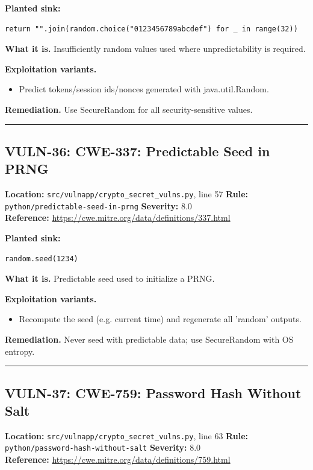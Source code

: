 \documentclass[11pt,a4paper]{article}
\begin{document}
\noindent\textbf{Planted sink:}
\begin{lstlisting}
return "".join(random.choice("0123456789abcdef") for _ in range(32))
\end{lstlisting}
\noindent\textbf{What it is.} Insufficiently random values used where unpredictability is required.

\noindent\textbf{Exploitation variants.}
\begin{itemize}[leftmargin=1.4em,itemsep=1pt,topsep=2pt]
\item Predict tokens/session ids/nonces generated with java.util.Random.
\end{itemize}
\noindent\textbf{Remediation.} Use SecureRandom for all security-sensitive values.

\vspace{4pt}\hrule\vspace{6pt}
\subsection{VULN-36: CWE-337: Predictable Seed in PRNG}
\noindent\textbf{Location:} \texttt{src/vulnapp/crypto\_secret\_vulns.py}, line 57 \quad \textbf{Rule:} \texttt{python/predictable-seed-in-prng} \quad \textbf{Severity:} 8.0
\\ \textbf{Reference:} \url{https://cwe.mitre.org/data/definitions/337.html}

\noindent\textbf{Planted sink:}
\begin{lstlisting}
random.seed(1234)
\end{lstlisting}
\noindent\textbf{What it is.} Predictable seed used to initialize a PRNG.

\noindent\textbf{Exploitation variants.}
\begin{itemize}[leftmargin=1.4em,itemsep=1pt,topsep=2pt]
\item Recompute the seed (e.g. current time) and regenerate all 'random' outputs.
\end{itemize}
\noindent\textbf{Remediation.} Never seed with predictable data; use SecureRandom with OS entropy.

\vspace{4pt}\hrule\vspace{6pt}
\subsection{VULN-37: CWE-759: Password Hash Without Salt}
\noindent\textbf{Location:} \texttt{src/vulnapp/crypto\_secret\_vulns.py}, line 63 \quad \textbf{Rule:} \texttt{python/password-hash-without-salt} \quad \textbf{Severity:} 8.0
\\ \textbf{Reference:} \url{https://cwe.mitre.org/data/definitions/759.html}
\end{document}

